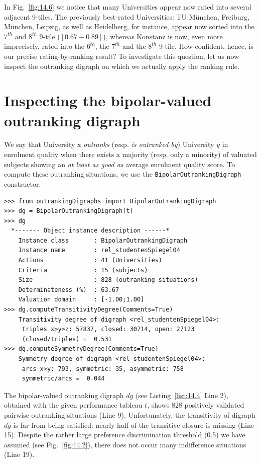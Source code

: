 In Fig.~\vref{fig:14.6} we notice that many Universities appear now rated into several adjacent 9-tiles. The previously best-rated Universities: TU München, Freiburg, München, Leipzig, as well as  Heidelberg, for instance, appear now sorted into the $7^{th}$ and $8^{th}$ 9-tile ($[0.67 - 0.89]$), whereas Konstanz is now, even more imprecisely, rated into the $6^{th}$, the $7^{th}$ and the $8^{th}$ 9-tile.
How confident, hence, is our precise \Copeland rating-by-ranking result? To investigate this question, let us now inspect the outranking digraph on which we actually apply the \Copeland ranking rule.

\section{Inspecting the bipolar-valued outranking digraph}
\label{sec:14.2}

We say that University x \emph{outranks} (resp. \emph{is outranked by}) University $y$ in enrolment quality when there exists a majority (resp. only a minority) of valuated subjects showing an \emph{at least as good as} average enrolment quality score. To compute these outranking situations, we use the \texttt{BipolarOutrankingDigraph} constructor.
\begin{lstlisting}[caption={Computing 9-tiles of the enrolment quality scores per subject},label=list:14.4]
>>> from outrankingDigraphs import BipolarOutrankingDigraph
>>> dg = BipolarOutrankingDigraph(t) 
>>> dg
  *------- Object instance description ------*
    Instance class       : BipolarOutrankingDigraph
    Instance name        : rel_studentenSpiegel04
    Actions              : 41 (Universities)
    Criteria             : 15 (subjects)
    Size                 : 828 (outranking situations)
    Determinateness (%)  : 63.67
    Valuation domain     : [-1.00;1.00]
>>> dg.computeTransitivityDegree(Comments=True)
    Transitivity degree of digraph <rel_studentenSpiegel04>:
     triples x>y>z: 57837, closed: 30714, open: 27123
     (closed/triples) =  0.531
>>> dg.computeSymmetryDegree(Comments=True)
    Symmetry degree of digraph <rel_studentenSpiegel04>:
     arcs x>y: 793, symmetric: 35, asymmetric: 758
     symmetric/arcs =  0.044
\end{lstlisting}

The bipolar-valued outranking digraph $dg$ (see Listing~\vref{list:14.4} Line 2), obtained with the given performance tableau $t$, shows 828 positively validated pairwise outranking situations (Line 9). Unfortunately, the transitivity of digraph $dg$ is far from being satisfied: nearly half of the transitive closure is missing (Line 15). Despite the rather large preference discrimination threshold (0.5) we have assumed (see Fig.~\vref{fig:14.2}), there does not occur many indifference situations (Line 19).

